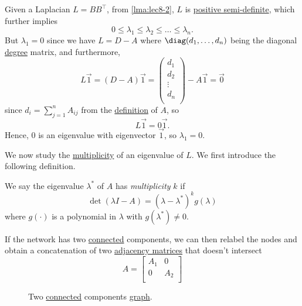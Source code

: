 \begin{remark}[Laplacian]\label{rmk:Laplacian}
	Given a Laplacian \(L = B B^{\top}\), from \autoref{lma:lec8-2}, \(L\) is \hyperref[def:positive-semi-definite]{positive semi-definite},
	which further implies
	\[
		0 \leq \lambda_1 \leq \lambda_2 \leq \ldots \leq \lambda_n.
	\]
	But \(\lambda_1 = 0\) since we have \(L = D-A\) where \(\diag(d_1, \ldots , d_n)\) being the diagonal \hyperref[def:degree]{degree} matrix,
	and furthermore,
	\[
		L \vec{1} = (D - A)\vec{1} = \begin{pmatrix}
			d_1    \\
			d_2    \\
			\vdots \\
			d_n    \\
		\end{pmatrix} - A\vec{1} = \vec{0}
	\]
	since \(d_{i} = \sum_{j=1}^{n} A_{ij}\) from the \hyperref[def:adjacency-matrix]{definition} of \(A\), so
	\[
		L \vec{1} = 0 \vec{1}.
	\]
	Hence, \(0\) is an eigenvalue with eigenvector \(\vec{1}\), so \(\lambda _1=0\).
\end{remark}

We now study the \hyperref[def:multiplicity]{multiplicity} of an eigenvalue of \(L\). We first introduce the following definition.
\begin{definition}[Multiplicity]\label{def:multiplicity}
	We say the eigenvalue \(\lambda ^{\ast} \) of \(A\) has \emph{multiplicity} \(k\) if
	\[
		\det(\lambda I - A) = (\lambda - \lambda ^{\ast} )^k g(\lambda )
	\]
	where \(g(\cdot)\) is a polynomial in \(\lambda\) with \(g(\lambda ^{\ast} )\neq 0\).
\end{definition}

If the network has two \hyperref[def:connected]{connected} components, we can then relabel the nodes and obtain a concatenation of two
\hyperref[def:adjacency-matrix]{adjacency matrices} that doesn't intersect
\[
	A = \begin{bmatrix}
		A_1 & 0   \\
		0   & A_2 \\
	\end{bmatrix}
\]
\begin{figure}[H]
	\centering
	\caption{Two \hyperref[def:connected]{connected} components \hyperref[def:graph]{graph}.}
	\label{fig:two-component-graph}
\end{figure}

